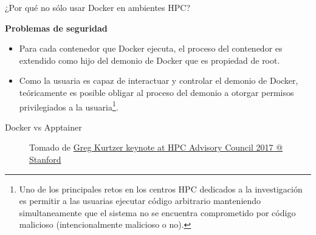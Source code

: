 \documentclass[11pt]{beamer}
\begin{document}
\begin{frame}{¿Por qué no sólo usar Docker en ambientes HPC?}

\begin{center}
	\textbf{Problemas de seguridad}
\end{center}

\begin{itemize}
	\item Para cada contenedor que Docker ejecuta, el proceso del contenedor es extendido como hijo del demonio de Docker que es propiedad de root. 
	\item Como la usuaria es capaz de interactuar y controlar el demonio de Docker, teóricamente es posible obligar al proceso del demonio a otorgar permisos privilegiados a la usuaria\footnote{ Uno de los principales retos en los centros HPC dedicados a la investigación es permitir a las usuarias ejecutar código arbitrario manteniendo simultaneamente que el sistema no se encuentra comprometido por código malicioso (intencionalmente malicioso o no).}.
\end{itemize}

\end{frame}

\begin{frame}{Docker vs Apptainer}

\begin{figure}%
    \centering
    \qquad
    \caption{Tomado de  \href{https://www.hpcadvisorycouncil.com/events/2017/stanford-workshop/pdf/GMKurtzer_Singularity_Keynote_Tuesday_02072017.pdf}{Greg Kurtzer keynote at HPC Advisory Council 2017 @ Stanford}}%
    \label{fig:example}%
\end{figure}

\end{frame}
\end{document}
